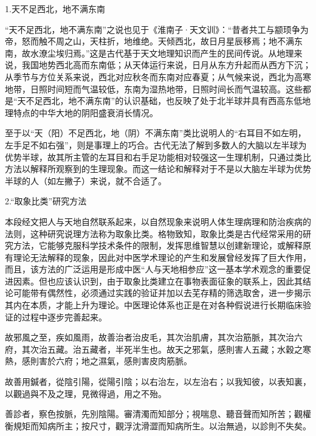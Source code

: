 \documentclass[12pt]{ctexbook}
\begin{document}

1.天不足西北，地不满东南

“天不足西北，地不满东南”之说也见于《淮南子·天文训》：“昔者共工与颛顼争为帝，怒而触不周之山，天柱折，地维绝。天倾西北，故日月星辰移焉；地不满东南，故水潦尘埃归焉。”这是古代基于天文地理知识而产生的民间传说。从地理来说，我国地势西北高而东南低；从天体运行来说，日月从东方升起而从西方下沉；从季节与方位关系来说，西北对应秋冬而东南对应春夏；从气候来说，西北为高寒地带，日照时间短而气温较低，东南为湿热地带，日照时间长而气温较高。这些都是“天不足西北，地不满东南”的认识基础，也反映了处于北半球并具有西高东低地理特点的中华大地的阴阳盛衰消长情况。

至于以“天（阳）不足西北，地（阴）不满东南”类比说明人的“右耳目不如左明，左手足不如右强”，则是事理上的巧合。古代无法了解到多数人的大脑以左半球为优势半球，故其所主管的左耳目和右手足功能相对较强这一生理机制，只通过类比方法以解释所观察到的生理现象。而这一结论和解释对于不是以大脑左半球为优势半球的人（如左撇子）来说，就不合适了。

2.“取象比类”研究方法

本段经文把人与天地自然联系起来，以自然现象来说明人体生理病理和防治疾病的法则，这种研究说理方法称为取象比类。格物致知，取象比类是古代经常采用的研究方法，它能够克服科学技术条件的限制，发挥思维智慧以创建新理论，或解释原有理论无法解释的现象，因此对中医学术理论的产生和发展曾经发挥了巨大作用，而且，该方法的广泛运用是形成中医“人与天地相参应”这一基本学术观念的重要促进因素。但也应该认识到，由于取象比类建立在事物表面征象的联系上，因此其结论可能带有偶然性，必须通过实践的验证并加以去芜存精的筛选取舍，进一步揭示其内在本质，才能上升为理论。中医理论体系也正是在对各种假说进行长期临床验证的过程中逐步完善起来。


\begin{yuanwen}
故邪風之至，疾如風雨，故善治者治皮毛，其次治肌膚，其次治筋脈，其次治六府，其次治五藏。治五藏者，半死半生也。故天之邪氣，感則害人五藏；水穀之寒熱，感則害於六府；地之濕氣，感則害皮肉筋脈。

故善用鍼者，從陰引陽，從陽引陰；以右治左，以左治右；以我知彼，以表知裏，以觀過與不及之理，見微得過，用之不殆。

善診者，察色按脈，先別陰陽。審清濁而知部分；視喘息、聽音聲而知所苦；觀權衡規矩而知病所主；按尺寸，觀浮沈滑澀而知病所生。以治無過，以診則不失矣。
\end{yuanwen}

\end{document}
